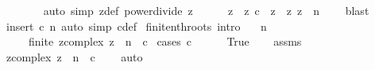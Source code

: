 \begin{isabellebody}
\ \ \ \ \ \ \isamarkupfalse%
\ {\isacharparenleft}{\kern0pt}auto\ simp{\isacharcolon}{\kern0pt}\ z{\isacharprime}{\kern0pt}{\isacharunderscore}{\kern0pt}def\ power{\isacharunderscore}{\kern0pt}divide\ z{\isacharparenright}{\kern0pt}\isanewline
\ \ \ \ \isamarkupfalse%
\ {\isachardoublequoteopen}z\ {\isasymin}\ {\isacharparenleft}{\kern0pt}{\isasymlambda}z{\isachardot}{\kern0pt}\ c{\isacharprime}{\kern0pt}\ {\isacharasterisk}{\kern0pt}\ z{\isacharparenright}{\kern0pt}\ {\isacharbackquote}{\kern0pt}\ {\isacharbraceleft}{\kern0pt}z{\isachardot}{\kern0pt}\ z\ {\isacharcircum}{\kern0pt}\ n\ {\isacharequal}{\kern0pt}\ {}{\isacharbraceright}{\kern0pt}{\isachardoublequoteclose}\ \isamarkupfalse%
\ blast\isanewline
\ \ \isamarkupfalse%
\ {\isacharparenleft}{\kern0pt}insert\ c\ n{\isacharcomma}{\kern0pt}\ auto\ simp{\isacharcolon}{\kern0pt}\ c{\isacharprime}{\kern0pt}{\isacharunderscore}{\kern0pt}def{\isacharparenright}{\kern0pt}\isanewline
{}\isamarkupfalse%
%
\endisatagproof
{\isafoldproof}%
%
\isadelimproof
\isanewline
%
\endisadelimproof
\isanewline
{}\isamarkupfalse%
\ finite{\isacharunderscore}{\kern0pt}nth{\isacharunderscore}{\kern0pt}roots\ {\isacharbrackleft}{\kern0pt}intro{\isacharbrackright}{\kern0pt}{\isacharcolon}{\kern0pt}\isanewline
\ \ \ {\isachardoublequoteopen}n\ {\isachargreater}{\kern0pt}\ {}{\isachardoublequoteclose}\isanewline
\ \ \ \ \ {\isachardoublequoteopen}finite\ {\isacharbraceleft}{\kern0pt}z{\isacharcolon}{\kern0pt}{\isacharcolon}{\kern0pt}complex{\isachardot}{\kern0pt}\ z\ {\isacharcircum}{\kern0pt}\ n\ {\isacharequal}{\kern0pt}\ c{\isacharbraceright}{\kern0pt}{\isachardoublequoteclose}\isanewline
%
\isadelimproof
%
\endisadelimproof
%
\isatagproof
{}\isamarkupfalse%
\ {\isacharparenleft}{\kern0pt}cases\ {\isachardoublequoteopen}c\ {\isacharequal}{\kern0pt}\ {}{\isachardoublequoteclose}{\isacharparenright}{\kern0pt}\isanewline
\ \ \isamarkupfalse%
\ True\isanewline
\ \ \isamarkupfalse%
\ assms\ \isamarkupfalse%
\ {\isachardoublequoteopen}{\isacharbraceleft}{\kern0pt}z{\isacharcolon}{\kern0pt}{\isacharcolon}{\kern0pt}complex{\isachardot}{\kern0pt}\ z\ {\isacharcircum}{\kern0pt}\ n\ {\isacharequal}{\kern0pt}\ c{\isacharbraceright}{\kern0pt}\ {\isacharequal}{\kern0pt}\ {\isacharbraceleft}{\kern0pt}{}{\isacharbraceright}{\kern0pt}{\isachardoublequoteclose}\ \isamarkupfalse%
\ auto\isanewline

\end{isabellebody}
